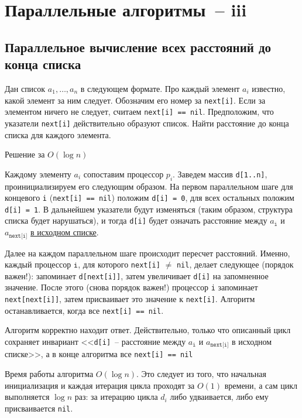 \section{Параллельные алгоритмы~-- iii}

\secauthor{\denis, \egor}

\subsection{Параллельное вычисление всех расстояний до конца списка}
\begin{problem*}
Дан список $a_1, \ldots, a_n$  в следующем формате. Про каждый элемент $a_i$ известно, какой элемент за ним следует. Обозначим его номер за \texttt{next[i]}. Если за элементом ничего не следует, считаем \texttt{next[i] == nil}. Предположим, что указатели \texttt{next[i]} действительно образуют список. Найти расстояние до конца списка для каждого элемента.
\end{problem*}
\begin{algodescription}{Решение за $O(\log n)$}

Каждому элементу $a_i$ сопоставим процессор $p_i$. Заведем массив \texttt{d[1..n]}, проинициализируем его следующим образом. На первом параллельном шаге для концевого \texttt{i} (\texttt{next[i] == nil}) положим \texttt{d[i] = 0}, для всех остальных положим \texttt{d[i] = 1}. В дальнейшем указатели будут изменяться (таким образом, структура списка будет нарушаться), и тогда \texttt{d[i]} будет означать расстояние между $a_\texttt{i}$ и $a_{\texttt{next[i]}}$ \underline{в исходном списке}.

Далее на каждом параллельном шаге происходит пересчет расстояний. Именно, каждый процессор $\mathtt i$, для которого \texttt{next[i]} $\neq$ \texttt{nil}, делает следующее (порядок важен!): запоминает \texttt{d[next[i]]}, затем увеличивает \texttt{d[i]} на запомненное значение. После этого (снова порядок важен!) процессор \texttt{i} запоминает \texttt{next[next[i]]}, затем присваивает это значение к \texttt{next[i]}. Алгоритм останавливается, когда все \texttt{next[i] == nil}.

Алгоритм корректно находит ответ. Действительно, только что описанный цикл сохраняет инвариант <<\texttt{d[i]}~-- расстояние между $a_\texttt{i}$ и $a_\texttt{next[i]}$ в исходном списке>>, а в конце алгоритма все \texttt{next[i] == nil}

Время работы алгоритма $O(\log n)$. Это следует из того, что начальная инициализация и каждая итерация цикла проходят за $O(1)$ времени, а сам цикл выполняется $\log n$ раз: за итерацию цикла $d_i$ либо удваивается, либо ему присваивается \texttt{nil}.
\end{algodescription}

